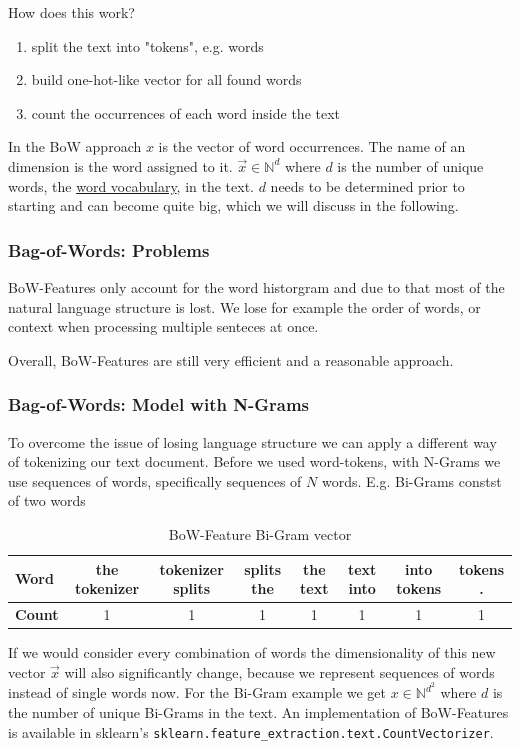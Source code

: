 \documentclass[a4paper]{article}
\begin{document}
How does this work?
\begin{enumerate}
  \item split the text into "tokens", e.g. words
  \item build one-hot-like vector for all found words
  \item count the occurrences of each word inside the text
\end{enumerate}
In the BoW approach $x$ is the vector of word occurrences. The name of an dimension is the word assigned to it.
$\vec{x} \in \mathbb{N}^d$ where $d$ is the number of unique words, the \underline{word vocabulary}, in the text.
$d$ needs to be determined prior to starting and can become quite big, which we will discuss in the following.
\subsubsection{Bag-of-Words: Problems}
BoW-Features only account for the word historgram and due to that most of the natural language structure is lost.
We lose for example the order of words, or context when processing multiple senteces at once.

Overall, BoW-Features are still very efficient and a reasonable approach.

\subsubsection{Bag-of-Words: Model with N-Grams}
To overcome the issue of losing language structure we can apply a different way of tokenizing our text document.
Before we used word-tokens, with N-Grams we use sequences of words, specifically sequences of $N$ words.
E.g. Bi-Grams constst of two words
\begin{table}[h]
  \centering
  \begin{tabular}{|l|ccccccc|}
    \hline
    \textbf{Word} & the tokenizer & tokenizer splits & splits the & the text & text into & into tokens & tokens . \\
    \hline
    \textbf{Count} & 1 & 1 & 1 & 1 & 1 & 1 & 1 \\
    \hline
  \end{tabular}
  \caption{BoW-Feature Bi-Gram vector}
  \label{tab:bow-bi-gram}
\end{table}
If we would consider every combination of words the dimensionality of this new vector $\vec{x}$ will also significantly change, because we represent sequences of words instead of single words now.
For the Bi-Gram example we get $x \in \mathbb{N}^{d^2}$ where $d$ is the number of unique Bi-Grams in the text.
An implementation of BoW-Features is available in sklearn's \lstinline{sklearn.feature_extraction.text.CountVectorizer}.
\end{document}
